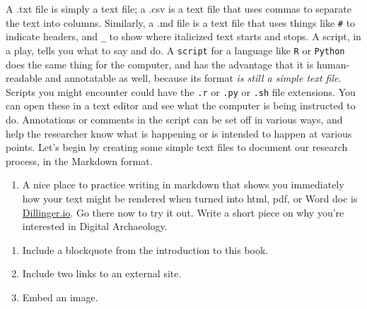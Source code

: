 \documentclass[english,]{book}
\providecommand{\tightlist}{%
  \setlength{\itemsep}{0pt}\setlength{\parskip}{0pt}}
\begin{document}
A .txt file is simply a text file; a .csv is a text file that uses
commas to separate the text into columns. Similarly, a .md file is a
text file that uses things like \texttt{\#} to indicate headers, and
\texttt{\_} to show where italicized text starts and stops. A script, in
a play, tells you what to say and do. A \texttt{script} for a language
like \texttt{R} or \texttt{Python} does the same thing for the computer,
and has the advantage that it is human-readable and annotatable as well,
because its format \emph{is still a simple text file}. Scripts you might
encounter could have the \texttt{.r} or \texttt{.py} or \texttt{.sh}
file extensions. You can open these in a text editor and see what the
computer is being instructed to do. Annotations or comments in the
script can be set off in various ways, and help the researcher know what
is happening or is intended to happen at various points. Let's begin by
creating some simple text files to document our research process, in the
Markdown format.

\begin{enumerate}
\def\labelenumi{\arabic{enumi}.}
\tightlist
\item
  A nice place to practice writing in markdown that shows you
  immediately how your text might be rendered when turned into html,
  pdf, or Word doc is \href{http://dillinger.io}{Dillinger.io}. Go there
  now to try it out. Write a short piece on why you're interested in
  Digital Archaeology.
\end{enumerate}

\begin{enumerate}
\def\labelenumi{\alph{enumi}.}
\tightlist
\item
  Include a blockquote from the introduction to this book.
\item
  Include two links to an external site.
\item
  Embed an image.
\end{enumerate}
\end{document}
